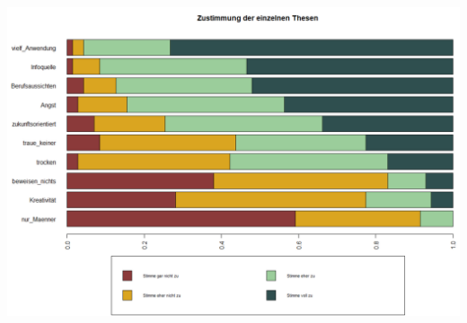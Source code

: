 \documentclass[12pt,a4paper,titlepage=true,parskip,ngerman]{scrartcl}
\begin{document}
\includegraphics[scale=0.49]{gestapelter_Barplot_Thesen}
\vspace{0.2cm}
\end{document}
